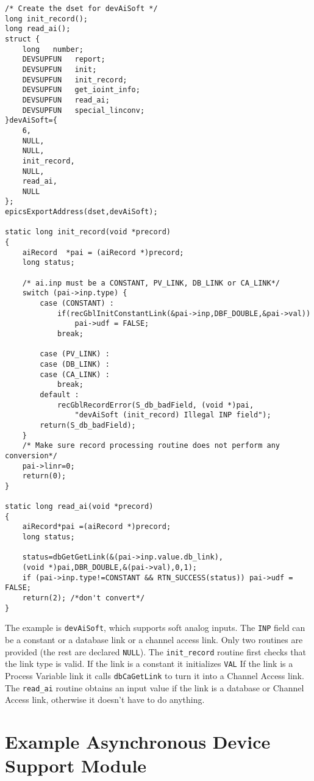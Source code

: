 \begin{verbatim}
/* Create the dset for devAiSoft */
long init_record();
long read_ai();
struct {
    long   number;
    DEVSUPFUN   report;
    DEVSUPFUN   init;
    DEVSUPFUN   init_record;
    DEVSUPFUN   get_ioint_info;
    DEVSUPFUN   read_ai;
    DEVSUPFUN   special_linconv;
}devAiSoft={
    6,
    NULL,
    NULL,
    init_record,
    NULL,
    read_ai,
    NULL
};
epicsExportAddress(dset,devAiSoft);

static long init_record(void *precord)
{
    aiRecord  *pai = (aiRecord *)precord;
    long status;

    /* ai.inp must be a CONSTANT, PV_LINK, DB_LINK or CA_LINK*/
    switch (pai->inp.type) {
        case (CONSTANT) :
            if(recGblInitConstantLink(&pai->inp,DBF_DOUBLE,&pai->val))
                pai->udf = FALSE;
            break;

        case (PV_LINK) :
        case (DB_LINK) :
        case (CA_LINK) :
            break;
        default :
            recGblRecordError(S_db_badField, (void *)pai,
                "devAiSoft (init_record) Illegal INP field");
        return(S_db_badField);
    }
    /* Make sure record processing routine does not perform any conversion*/
    pai->linr=0;
    return(0);
}

static long read_ai(void *precord)
{
    aiRecord*pai =(aiRecord *)precord;
    long status;

    status=dbGetGetLink(&(pai->inp.value.db_link),
    (void *)pai,DBR_DOUBLE,&(pai->val),0,1);
    if (pai->inp.type!=CONSTANT && RTN_SUCCESS(status)) pai->udf = FALSE;
    return(2); /*don't convert*/
}
\end{verbatim}The example is \verb|devAiSoft|, which supports soft analog inputs. The \verb|INP| field can be a constant or a database link or a 
channel access link. Only two routines are provided (the rest are declared \verb|NULL|). The \verb|init_record| routine first checks 
that the link type is valid. If the link is a constant it initializes \verb|VAL| If the link is a Process Variable link it calls 
\verb|dbCaGetLink| to turn it into a Channel Access link. The \verb|read_ai| routine obtains an input value if the link is a database 
or Channel Access link, otherwise it doesn't have to do anything.  

\section{Example Asynchronous Device Support Module}


